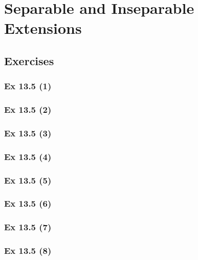 \newpage		%

\section{Separable and Inseparable Extensions}\label{sec:13.5}	
\subsection*{Exercises}\label{sec:13.5_Exercises}

\subsubsection{Ex 13.5 (1)}\label{sec:Ex_13.5.1}

\subsubsection{Ex 13.5 (2)}\label{sec:Ex_13.5.2}

\subsubsection{Ex 13.5 (3)}\label{sec:Ex_13.5.3}

\subsubsection{Ex 13.5 (4)}\label{sec:Ex_13.5.4}

\subsubsection{Ex 13.5 (5)}\label{sec:Ex_13.5.5}

\subsubsection{Ex 13.5 (6)}\label{sec:Ex_13.5.6}

\subsubsection{Ex 13.5 (7)}\label{sec:Ex_13.5.7}

\subsubsection{Ex 13.5 (8)}\label{sec:Ex_13.5.8}

